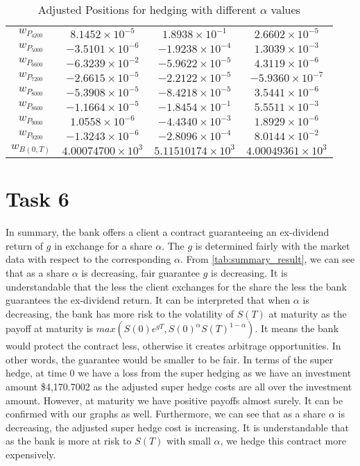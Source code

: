 \begin{table}[H]
\begin{tabular}{|c|c|c|c|}
        \(w_{P_{4200}}\) & $8.1452 \times 10^{-5}$  & $1.8938 \times 10^{-1}$  & $2.6602 \times 10^{-5}$ \\
        \(w_{P_{5000}}\) & $-3.5101 \times 10^{-6}$ & $-1.9238 \times 10^{-4}$ & $1.3039 \times 10^{-3}$ \\
        \(w_{P_{6600}}\) & $-6.3239 \times 10^{-2}$ & $-5.9622 \times 10^{-5}$ & $4.3119 \times 10^{-6}$ \\
        \(w_{P_{7200}}\) & $-2.6615 \times 10^{-5}$ & $-2.2122 \times 10^{-5}$ & $-5.9360 \times 10^{-7}$ \\
        \(w_{P_{8000}}\) & $-5.3908 \times 10^{-5}$ & $-8.4218 \times 10^{-5}$ & $3.5441 \times 10^{-6}$ \\
        \(w_{P_{8600}}\) & $-1.1664 \times 10^{-5}$ & $-1.8454 \times 10^{-1}$ & $5.5511 \times 10^{-3}$ \\
        \(w_{P_{9000}}\) & $1.0558 \times 10^{-6}$  & $-4.4340 \times 10^{-3}$ & $1.8929 \times 10^{-6}$ \\
        \(w_{P_{9200}}\) & $-1.3243 \times 10^{-6}$ & $-2.8096 \times 10^{-4}$ & $8.0144 \times 10^{-2}$ \\
        \(w_{B(0,T)}\) & $4.00074700 \times 10^{3}$   & $5.11510174 \times 10^{3}$   & $ 4.00049361 \times 10^{3}$ \\
        \hline
    \end{tabular}
    \caption{Adjusted Positions for hedging with different $\alpha$ values}
    \label{tab:adjusted alpha_values}
\end{table}

\newpage
\section*{Task 6}

In summary, the bank offers a client a contract guaranteeing an ex-dividend return of \(g\) in exchange for a share \(\alpha\). The \(g\) is determined fairly with the market data with respect to the corresponding \(\alpha\). From \ref{tab:summary_result}, we can see that as a share \(\alpha\) is decreasing, fair guarantee \(g\) is decreasing. It is understandable that the less the client exchanges for the share the less the bank guarantees the ex-dividend return. It can be interpreted that when \(\alpha\) is decreasing, the bank has more risk to the volatility of  \(S(T)\) at maturity as the payoff at maturity is \(max(S(0)e^{gT},S(0)^\alpha S(T)^{1-\alpha})\). It means the bank would protect the contract less, otherwise it creates arbitrage opportunities. In other words, the guarantee would be smaller to be fair.
In terms of the super hedge, at time 0 we have a loss from the super hedging as we have an investment amount \$4,170.7002 as the adjusted super hedge costs are all over the investment amount. However, at maturity we have positive payoffs almost surely. It can be confirmed with our graphs as well.
Furthermore, we can see that as a share \(\alpha\) is decreasing, the adjusted super hedge cost is increasing. It is understandable that as the bank is more at risk to \(S(T)\) with small \(\alpha\), we hedge this contract more expensively.

